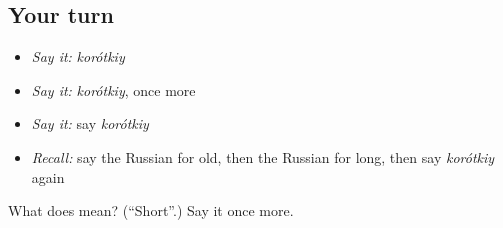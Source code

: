 \subsection*{Your turn}
\begin{itemize}
\raggedright
  \item \emph{Say it:} \emph{korótkiy}
  \item \emph{Say it:} \emph{korótkiy}, once more
  \item \emph{Say it:} say \emph{korótkiy}
  \item \emph{Recall:} say the Russian for old, then the Russian for long, then say \emph{korótkiy} again
\end{itemize}

\begin{tcolorbox}[breakable,colback=teal!4,colframe=teal!35!black,title={Before you move on}]
What does  mean? (\textquotedblleft{}Short\textquotedblright{}.) Say it once more.
\end{tcolorbox}
